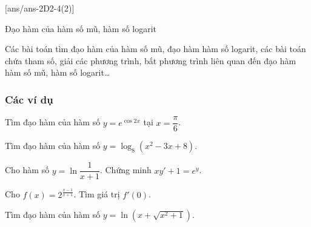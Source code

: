 [ans/ans-2D2-4(2)]
\begin{dang}{Đạo hàm của hàm số mũ, hàm số logarit}
\end{dang}
Các bài toán tìm đạo hàm của hàm số mũ, đạo hàm hàm số logarit, các bài toán chứa tham số, giải các phương trình, bất phương trình liên quan đến đạo hàm hàm số mũ, hàm số logarit…
\subsubsection{Các ví dụ}
\begin{vd}%
	Tìm đạo hàm của hàm số $y=e^{\cos 2 x}$ tại $x=\dfrac{\pi}{6}$.
\end{vd}
\begin{vd}%
	Tìm đạo hàm của hàm số $y=\log_8\left( x^2-3x+8 \right)$.
\end{vd}
\begin{vd}%
	Cho hàm số $y=\ln \dfrac{1}{x+1}$. Chứng minh $xy'+1=e^{y}$.
\end{vd}
\begin{vd}%
	Cho $f(x)=2^{\frac{x-1}{x+1}}$. Tìm giá trị $f'(0)$.
\end{vd}
\begin{vd}%
	Tìm đạo hàm của hàm số $y=\ln (x+\sqrt{x^{2}+1})$.
\end{vd}
